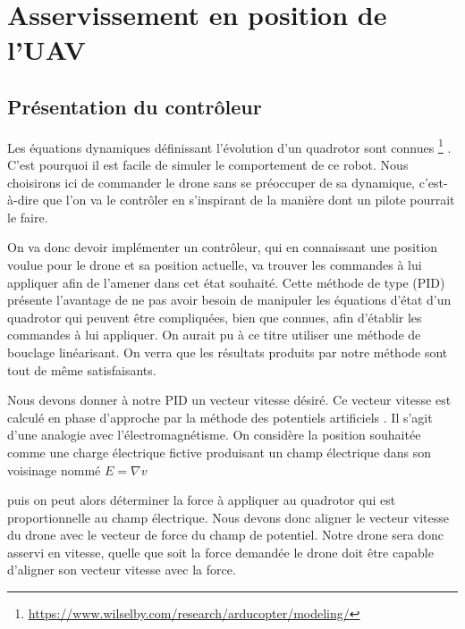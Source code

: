 \section{Asservissement en position de l'UAV}

\subsection{Présentation du contrôleur}

Les équations dynamiques définissant l’évolution d’un quadrotor sont connues \footnote{\url{https://www.wilselby.com/research/arducopter/modeling/}} \cite{uavequation}. C’est pourquoi il est facile de simuler le comportement de ce robot. 
Nous choisirons ici de commander le drone sans se préoccuper de sa dynamique, 
c'est-à-dire que l’on va le contrôler en s’inspirant de la manière dont un pilote pourrait le faire.


On va donc devoir implémenter un contrôleur, qui en connaissant une position voulue pour le drone et sa position actuelle, 
va trouver les commandes à lui appliquer afin de l'amener dans cet état souhaité. Cette méthode de type (PID) présente 
l’avantage de ne pas avoir besoin de manipuler les équations d’état d’un quadrotor qui peuvent être compliquées, 
bien que connues, afin d’établir les commandes à lui appliquer. On aurait pu à ce titre utiliser une méthode de bouclage linéarisant. 
On verra que les résultats produits par notre méthode sont tout de même satisfaisants.

Nous devons donner à notre PID un vecteur vitesse désiré. 
Ce vecteur vitesse est calculé en phase d’approche par la méthode des potentiels artificiels \cite{Khatib}. 
Il s’agit d’une analogie avec l’électromagnétisme. On considère la position souhaitée comme une charge électrique fictive 
produisant un champ électrique dans son voisinage nommé $ E = \nabla v $ 

puis on peut alors déterminer la force à  appliquer au quadrotor qui est proportionnelle au champ électrique. 
Nous devons donc aligner le vecteur vitesse du drone avec le vecteur de force du champ de potentiel. Notre drone sera donc asservi en vitesse, 
quelle que soit la force demandée le drone doit être capable d’aligner son vecteur vitesse avec la force. 

